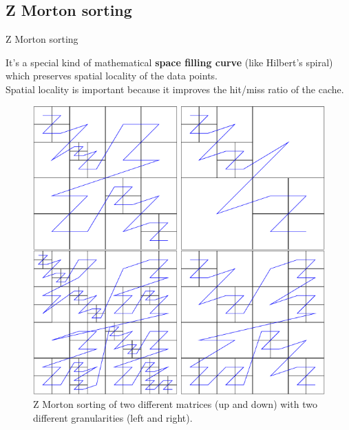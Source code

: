 \documentclass{beamer}
\begin{document}
	\subsection{Z Morton sorting}
	\begin{frame}{Z Morton sorting}
		\begin{minipage}{.48\textwidth}
			It’s a special kind of mathematical \textbf{space filling curve} (like Hilbert’s spiral) which preserves spatial locality of the data points.\\
			
			\bigskip
			Spatial locality is important because it improves the hit/miss ratio of the cache.
		\end{minipage}
		\hfill
		\begin{minipage}{.48\textwidth}
			\begin{figure}
				\includegraphics[scale=0.27]{zmorton}
				\caption*{{\tiny Z Morton sorting of two different matrices (up and down) with two different granularities (left and right).}}
			\end{figure}
		\end{minipage}
	\end{frame}
	
\end{document}
